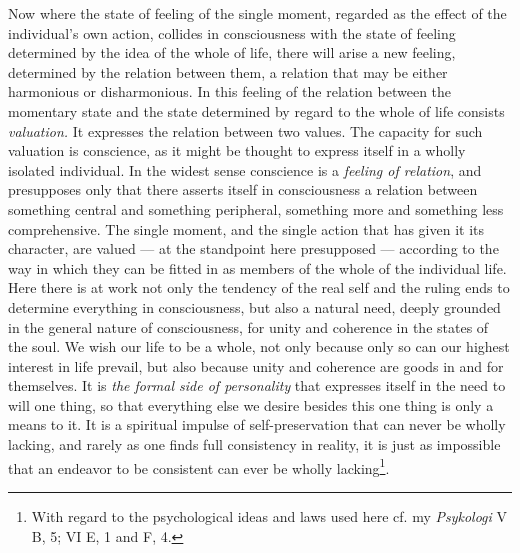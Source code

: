 \documentclass[12pt,a4paper,openany]{book}
\newcommand{\opage}[1]{\marginnote{\footnotesize\textit{[#1]}}}
\begin{document}
Now where the state of feeling of the single moment, regarded as the effect of the individual's own
action, collides in consciousness with the state of feeling determined by the idea of the whole of
life, there will arise a new feeling, determined by the relation between them, a relation that may be
either harmonious or disharmonious. In this feeling of the relation between the momentary state and
the state determined by regard to the whole of life consists \textit{valuation.} It expresses the
relation between two values. The capacity for such valuation is conscience, as it might be thought
to express itself in a wholly isolated individual. In the widest sense conscience is a
\textit{feeling of relation}, and presupposes only that there asserts itself in consciousness a
relation between something central and something peripheral, something more and something less
comprehensive. The single moment, and the single action that has given it its character, are valued
--- at the standpoint here presupposed --- according to the way in which they can be fitted in as
members of the
\opage{33}whole of the individual life. Here there is at work not only the tendency of the real self and the
ruling ends to determine everything in consciousness, but also a natural need, deeply grounded in
the general nature of consciousness, for unity and coherence in the states of the soul. We wish our
life to be a whole, not only because only so can our highest interest in life prevail, but also
because unity and coherence are goods in and for themselves. It is \textit{the formal side of
personality} that expresses itself in the need to will one thing, so that everything else we desire
besides this one thing is only a means to it. It is a spiritual impulse of self-preservation that can
never be wholly lacking, and rarely as one finds full consistency in reality, it is just as impossible
that an endeavor to be consistent can ever be wholly lacking\footnote[1]{With regard to the
psychological ideas and laws used here cf. my \textit{Psykologi} V B, 5; VI E, 1 and F, 4.}.
\end{document}

